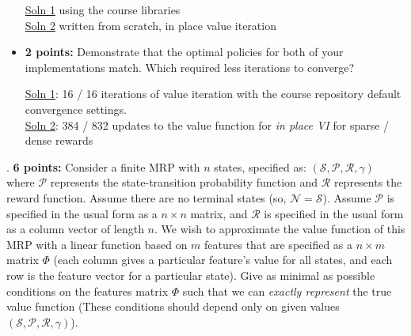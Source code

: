 \documentclass[12pt]{exam}
\begin{document}
\begin{questions}
\begin{itemize}
\begin{solution}
\href{https://github.com/TikhonJelvis/RL-book/blob/master/rl/problems/Midterm-Winter2021/midterm-p1-sol1.ipynb}{Soln 1} using the course libraries \\
\href{https://github.com/TikhonJelvis/RL-book/blob/master/rl/problems/Midterm-Winter2021/midterm-p1-sol2.ipynb}{Soln 2} written from scratch, in place value iteration
\end{solution}

\item {\bf 2 points:} Demonstrate that the optimal policies for both of your implementations match. Which required less iterations to converge?

\begin{solution}
\href{https://github.com/TikhonJelvis/RL-book/blob/master/rl/problems/Midterm-Winter2021/midterm-p1-sol1.ipynb}{Soln 1}:  16 / 16 iterations of value iteration with the course repository default convergence settings. \\
\href{https://github.com/TikhonJelvis/RL-book/blob/master/rl/problems/Midterm-Winter2021/midterm-p1-sol2.ipynb}{Soln 2}: 384 / 832 updates to the value function for {\em in place VI} for sparse / dense rewards \\

\end{solution}

\newpage{}


\end{itemize}


\newpage
{}. {\bf 6 points:} Consider a finite MRP with $n$ states, specified as: $(\mathcal{S}, \mathcal{P}, \mathcal{R}, \gamma)$ where $\mathcal{P}$ represents the state-transition probability function and $\mathcal{R}$ represents the reward function. Assume there are no terminal states (so, $\mathcal{N} = \mathcal{S}$). Assume $\mathcal{P}$ is specified in the usual form as a $n \times n$ matrix, and $\mathcal{R}$ is specified in the usual form as a column vector of length $n$. We wish to approximate the value function of this MRP with a linear function based on $m$ features that are specified as a $n \times m$ matrix $\Phi$ (each column gives a particular feature's value for all states, and each row is the feature vector for a particular state). Give as minimal as possible conditions on the features matrix $\Phi$ such that we can \emph{exactly represent} the true value function (These conditions should depend only on given values $(\mathcal{S}, \mathcal{P}, \mathcal{R}, \gamma)$).  


\end{questions}
\end{document}
